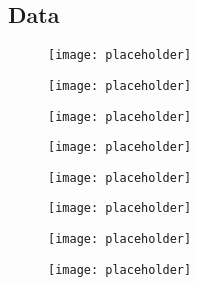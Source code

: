	\newpage
	\subsection{Data}
	
	\begin{figure}[h]
		\centering
		
		\begin{minipage}[h]{0.33\linewidth}
			\texttt{[image: placeholder]}
			\caption{}
			\label{fig:D:leadingbpt}
		\end{minipage}
		\quad
		\begin{minipage}[h]{0.33\linewidth}
			\texttt{[image: placeholder]}
			\caption{}
			\label{fig:D:leadingbptslice}
		\end{minipage}
	\end{figure}
	
	\begin{figure}[h]
		\centering
		
		\begin{minipage}[h]{0.33\linewidth}
			\texttt{[image: placeholder]}
			\caption{}
			\label{fig:D:leadingbeta}
		\end{minipage}
		\quad
		\begin{minipage}[h]{0.33\linewidth}
			\texttt{[image: placeholder]}
			\caption{}
			\label{fig:D:leadingbetaslice}
		\end{minipage}
	\end{figure}
	
	\begin{figure}[h]
		\centering
		
		\begin{minipage}[h]{0.33\linewidth}
			\texttt{[image: placeholder]}
			\caption{}
			\label{fig:D:leadingbphi}
		\end{minipage}
		\quad
		\begin{minipage}[h]{0.33\linewidth}
			\texttt{[image: placeholder]}
			\caption{}
			\label{fig:D:leadingbphislice}
		\end{minipage}
	\end{figure}
	
	\begin{figure}[h]
		\centering
		
		\begin{minipage}[h]{0.33\linewidth}
			\texttt{[image: placeholder]}
			\caption{}
			\label{fig:D:leadingbm}
		\end{minipage}
		\quad
		\begin{minipage}[h]{0.33\linewidth}
			\texttt{[image: placeholder]}
			\caption{}
			\label{fig:D:leadingbmslice}
		\end{minipage}
	\end{figure}

